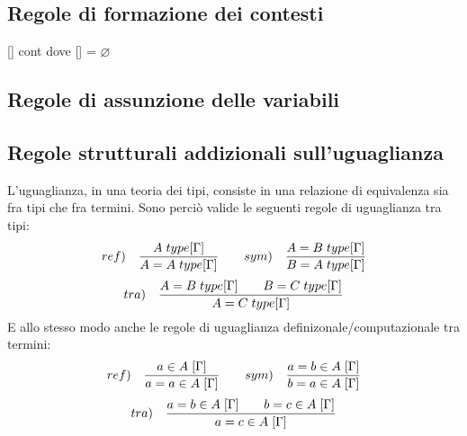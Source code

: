 \subsection{Regole di formazione dei contesti}
\label{subsec:formazione-contesti}
\begin{center} [\hspace{0.1cm}] cont \quad dove [\hspace{0.1cm}] = $\varnothing$ \end{center}
\begin{prooftree}
\end{prooftree}
\subsection{Regole di assunzione delle variabili}
\label{subsec:assunzione-variabili}
\begin{prooftree}
\end{prooftree}
\subsection{Regole strutturali addizionali sull'uguaglianza}
\label{subsec:uguaglianza}
L'uguaglianza, in una teoria dei tipi, consiste in una relazione di equivalenza sia fra tipi che fra termini. Sono perci\`o valide le seguenti regole di uguaglianza tra tipi:
\[ ref) \quad \frac{A\hspace{0.1cm}type[\Gamma]}{A=A\hspace{0.1cm}type[\Gamma]} \qquad sym) \quad \frac{A=B\hspace{0.1cm}type[\Gamma]}{B=A\hspace{0.1cm}type[\Gamma]} \]
\[ tra) \quad \frac{A=B\hspace{0.1cm}type[\Gamma] \qquad B=C\hspace{0.1cm}type[\Gamma]}{A=C\hspace{0.1cm}type[\Gamma]} \]
E allo stesso modo anche le regole di uguaglianza definizonale/computazionale tra termini:
\[ ref) \quad \frac{a \in A\hspace{0.1cm}[\Gamma]}{a=a \in A\hspace{0.1cm}[\Gamma]} \qquad sym) \quad \frac{a=b\in A \hspace{0.1cm}[\Gamma]}{b=a \in A\hspace{0.1cm}[\Gamma]} \]
\[ tra) \quad \frac{a=b \in A\hspace{0.1cm}[\Gamma] \qquad b=c \in A\hspace{0.1cm}[\Gamma]}{a=c \in A\hspace{0.1cm}[\Gamma]} \]
